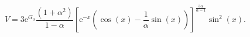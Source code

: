 \begin{equation}\label{SV2}
    V =3 \mathrm{e}^{G_{0}}\frac{(1+ \alpha^{2})}{1 - \alpha}[\mathrm{e}^{-x}(\cos{(x)} - \frac{1}{\alpha}\sin{(x)})]^{\frac{
    3\alpha}{\alpha -1}}\sin^{2}{(x)}.
\end{equation}

